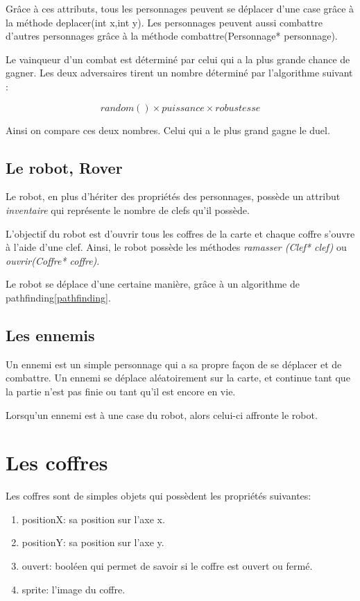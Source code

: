 \documentclass[a4paper,12pts]{article}
\begin{document}
Grâce à ces attributs, tous les personnages peuvent se déplacer d'une case grâce à la méthode deplacer(int x,int y). Les personnages peuvent aussi combattre d'autres personnages grâce à la méthode combattre(Personnage* personnage).

Le vainqueur d'un combat est déterminé par celui qui a la plus grande chance de gagner. Les deux adversaires tirent un nombre déterminé par l'algorithme suivant :

\begin{equation}
    random() \times puissance \times robustesse 
    \label{combat}
\end{equation}

Ainsi on compare ces deux nombres. Celui qui a le plus grand gagne le duel.

\subsection{Le robot, Rover}

Le robot, en plus d'hériter des propriétés des personnages, possède un attribut \emph{inventaire} qui représente le nombre de clefs qu'il possède.

L'objectif du robot est d'ouvrir tous les coffres de la carte et chaque coffre s'ouvre à l'aide d'une clef. Ainsi, le robot possède les méthodes \emph{ramasser
(Clef* clef)} ou \emph{ouvrir(Coffre* coffre)}.

Le robot se déplace d'une certaine manière, grâce à un algorithme de pathfinding\ref{pathfinding}.

\subsection{Les ennemis}

Un ennemi est un simple personnage qui a sa propre façon de se déplacer et de combattre. 
Un ennemi se déplace aléatoirement sur la carte, et continue tant que la partie n'est pas finie ou tant qu'il est encore en vie.

Lorsqu'un ennemi est à une case du robot, alors celui-ci affronte le robot.


\section{Les coffres}

Les coffres sont de simples objets qui possèdent les propriétés suivantes: 

\begin{enumerate}
	\item positionX: sa position sur l'axe x.
	\item positionY: sa position sur l'axe y. 
	\item ouvert: booléen qui permet de savoir si le coffre est ouvert ou fermé.
	\item sprite: l'image du coffre.
\end{enumerate}
\end{document}
